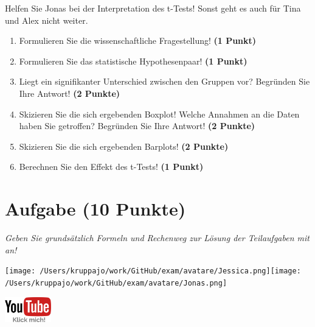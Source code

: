 \documentclass[a4paper, 9pt]{scrartcl}\usepackage[]{graphicx}\usepackage[]{xcolor}
\begin{document}
Helfen Sie Jonas bei der Interpretation des t-Tests! Sonst geht es auch für Tina und Alex nicht weiter.
  
\begin{enumerate}
  \item Formulieren Sie die wissenschaftliche Fragestellung! \textbf{(1 Punkt)}
  \item Formulieren Sie das statistische Hypothesenpaar! \textbf{(1 Punkt)}
\item Liegt ein signifikanter Unterschied zwischen den Gruppen vor? Begründen Sie Ihre Antwort! \textbf{(2 Punkte)}
\item Skizieren Sie die sich ergebenden Boxplot! Welche Annahmen an die Daten haben Sie getroffen? Begründen Sie Ihre
  Antwort! \textbf{(2 Punkte)} 
\item Skizieren Sie die sich ergebenden Barplots! \textbf{(2 Punkte)}
\item Berechnen Sie den Effekt des t-Tests! \textbf{(1 Punkt)}
\end{enumerate}
 
\clearpage

\section{Aufgabe \hfill (10 Punkte)}

\textit{Geben Sie grundsätzlich Formeln und Rechenweg zur Lösung der Teilaufgaben mit an!} \\[1Ex]
 

 
\begin{minipage}[t]{0.5\textwidth}
\texttt{[image: /Users/kruppajo/work/GitHub/exam/avatare/Jessica.png]}\hspace{-4mm}\texttt{[image: /Users/kruppajo/work/GitHub/exam/avatare/Jonas.png]}
\end{minipage}
\begin{minipage}[t]{0.5\textwidth}
\hfill
\href{https://youtu.be/kHmfEmU6lrk}{\includegraphics[width = 2cm]{img/youtube}}
\end{minipage}
\end{document}

